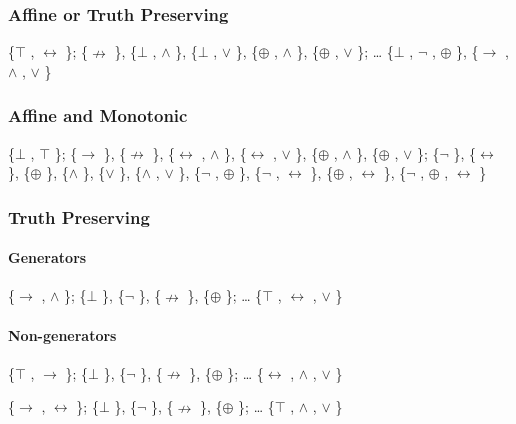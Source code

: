 \hypertarget{affine-or-truth-preserving}{%
\subsubsection{Affine or Truth
Preserving}\label{affine-or-truth-preserving}}

\{$\top$ , $\leftrightarrow$ \}; \{$\nrightarrow$ \}, \{$\bot$ , $\land$ \}, \{$\bot$ , $\lor$ \}, \{$\oplus$ , $\land$ \}, \{$\oplus$ , $\lor$ \}; \ldots{} \{$\bot$ ,
$\neg$ , $\oplus$ \}, \{$\to$ , $\land$ , $\lor$ \}

\hypertarget{affine-and-monotonic}{%
\subsubsection{Affine and Monotonic}\label{affine-and- monotonic}}

\{$\bot$ , $\top$ \}; \{$\to$ \}, \{$\nrightarrow$ \}, \{$\leftrightarrow$ , $\land$ \}, \{$\leftrightarrow$ , $\lor$ \}, \{$\oplus$ , $\land$ \}, \{$\oplus$ , $\lor$ \}; \{$\neg$ \},
\{$\leftrightarrow$ \}, \{$\oplus$ \}, \{$\land$ \}, \{$\lor$ \}, \{$\land$ , $\lor$ \}, \{$\neg$ , $\oplus$ \}, \{$\neg$ , $\leftrightarrow$ \}, \{$\oplus$ , $\leftrightarrow$ \}, \{$\neg$ ,
$\oplus$ , $\leftrightarrow$ \}

\hypertarget{truth-preserving}{%
\subsubsection{Truth Preserving}\label{truth-preserving}}

\hypertarget{generators}{%
\paragraph{Generators}\label{generators}}

\{$\to$ , $\land$ \}; \{$\bot$ \}, \{$\neg$ \}, \{$\nrightarrow$ \}, \{$\oplus$ \}; \ldots{} \{$\top$ , $\leftrightarrow$ , $\lor$ \}

\hypertarget{non-generators}{%
\paragraph{Non-generators}\label{non-generators}}

\{$\top$ , $\to$ \}; \{$\bot$ \}, \{$\neg$ \}, \{$\nrightarrow$ \}, \{$\oplus$ \}; \ldots{} \{$\leftrightarrow$ , $\land$ , $\lor$ \}

\{$\to$ , $\leftrightarrow$ \}; \{$\bot$ \}, \{$\neg$ \}, \{$\nrightarrow$ \}, \{$\oplus$ \}; \ldots{} \{$\top$ , $\land$ , $\lor$ \}

